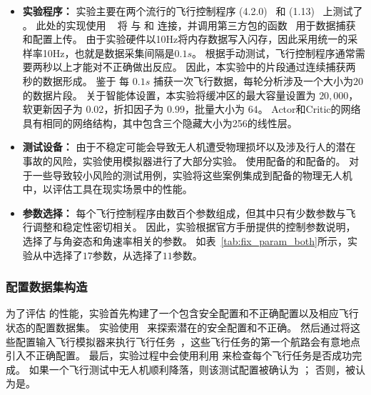 \begin{itemize}
    \item \textbf{实验程序：}
实验主要在两个流行的飞行控制程序  (4.2.0)~\cite{ardupilot} 和  (1.13)~\cite{px4} 上测试了 \nyctea。
此处的实现使用 ~\cite{mavlink} 将 \nyctea 与  和  连接，并调用第三方包的函数~\cite{pymavlink} 用于数据捕获和配置上传。
由于实验硬件以10Hz将内存数据写入闪存，因此采用统一的采样率10Hz，也就是数据采集间隔是$0.1s$。
根据手动测试，飞行控制程序通常需要两秒以上才能对不正确做出反应。
因此，本实验中的片段通过连续捕获两秒的数据形成。
鉴于 \nyctea 每 $0.1s$ 捕获一次飞行数据，每轮分析涉及一个大小为$20$的数据片段。
关于智能体设置，本实验将缓冲区的最大容量设置为 $20,000$，软更新因子为 $0.02$，折扣因子为 $0.99$，批量大小为 $64$。
Actor和Critic的网络具有相同的网络结构，其中包含三个隐藏大小为256的线性层。

\item \textbf{测试设备：}
由于不稳定可能会导致无人机遭受物理损坏以及涉及行人的潜在事故的风险，实验使用模拟器进行了大部分实验。
使用配备的和配备的。
对于一些导致较小风险的测试用例，实验将这些案例集成到配备的物理无人机 中，以评估工具在现实场景中的性能。

\item \textbf{参数选择：}
每个飞行控制程序由数百个参数组成，但其中只有少数参数与飞行调整和稳定性密切相关。
因此，实验根据官方手册提供的控制参数说明，选择了与角姿态和角速率相关的参数。
如表~\ref{tab:fix_param_both}所示，实验从中选择了$17$参数，从选择了$11$参数。



\end{itemize}


\subsubsection{配置数据集构造}
为了评估 \nyctea 的性能，实验首先构建了一个包含安全配置和不正确配置以及相应飞行状态的配置数据集。
实验使用~\cite{han2022control} 来探索潜在的安全配置和不正确。
然后通过将这些配置输入飞行模拟器来执行飞行任务~\cite{avc}，这些飞行任务的第一个航路会有意地点引入不正确配置。
最后，实验过程中会使用利用  来检查每个飞行任务是否成功完成。
如果一个飞行测试中无人机顺利降落，则该测试配置被确认为 ； 否则，被认为是。

